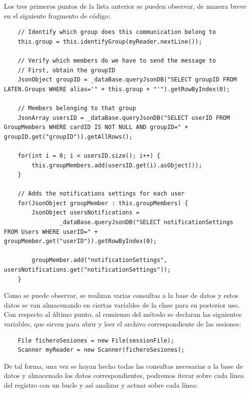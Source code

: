 Los tres primeros puntos de la lista anterior se pueden observar, de manera breve en el siguiente fragmento de código:

\begin{lstlisting}
    // Identify which group does this communication belong to
    this.group = this.identifyGroup(myReader.nextLine());
    
    // Verify which members do we have to send the message to
    // First, obtain the groupID
    JsonObject groupID = _dataBase.queryJsonDB("SELECT groupID FROM LATEN.Groups WHERE alias='" + this.group + "'").getRowByIndex(0);
    
    // Members belonging to that group
    JsonArray usersID = _dataBase.queryJsonDB("SELECT userID FROM GroupMembers WHERE cardID IS NOT NULL AND groupID=" + groupID.get("groupID")).getAllRows();
    
    for(int i = 0; i < usersID.size(); i++) {
        this.groupMembers.add(usersID.get(i).asObject());
    }
    
    // Adds the notifications settings for each user
    for(JsonObject groupMember : this.groupMembers) {
        JsonObject usersNotifications = 
                _dataBase.queryJsonDB("SELECT notificationSettings FROM Users WHERE userID=" + groupMember.get("userID")).getRowByIndex(0);
        
        groupMember.add("notificationSettings", usersNotifications.get("notificationSettings"));
    }
\end{lstlisting}

Como se puede observar, se realizan varias consultas a la base de datos y estos datos se van almacenando en ciertas variables de la clase para su posterior uso.\\

Con respecto al último punto, al comienzo del método se declaran las siguientes variables, que sirven para abrir y leer el archivo correspondiente de las sesiones:

\begin{lstlisting}
    File ficheroSesiones = new File(sessionFile);
    Scanner myReader = new Scanner(ficheroSesiones);
\end{lstlisting}

De tal forma, una vez se hayan hecho todas las consultas necesarias a la base de datos y almacenado los datos correspondientes, podremos iterar sobre cada línea del registro con un bucle y así analizar y actuar sobre cada línea:

